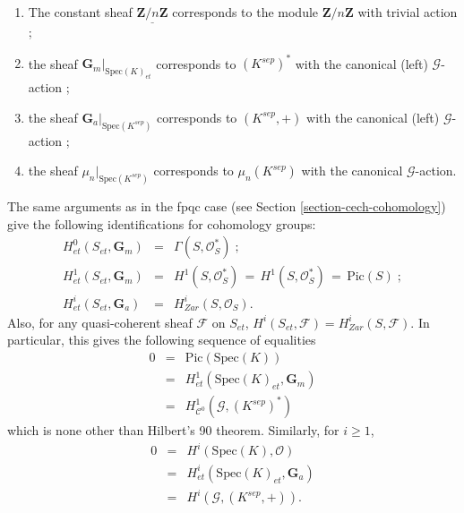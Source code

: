 \begin{example} $ $
\begin{enumerate}
\item The constant sheaf $\underline{\mathbf{Z}/n\mathbf{Z}}$ corresponds to 
the module $\mathbf{Z}/n\mathbf{Z}$ with trivial action ; 
\item the sheaf $\mathbf{G}_m|_{\text{Spec}(K)_{et}}$ corresponds to 
$(K^{sep})^*$ with the canonical (left) $\mathcal{G}$-action ;
\item the sheaf $\mathbf{G}_a|_{\text{Spec}(K^{sep})}$ corresponds to 
$(K^{sep}, +)$ with the canonical (left) $\mathcal{G}$-action ;
\item the sheaf $\mu_n|_{\text{Spec}(K^{sep})}$ corresponds to $\mu_n(K^{sep})$ 
with the canonical $\mathcal{G}$-action.
\end{enumerate}

\noindent
The same arguments as in the fpqc case (see
Section \ref{section-cech-cohomology})
give the following identifications for cohomology groups:
$$
\begin{matrix}
H_{et}^0(S_{et}, \mathbf{G}_m) & = & \Gamma(S, \mathcal{O}_S^*) \; ; \\
H_{et}^1(S_{et}, \mathbf{G}_m) & = & H^1(S, \mathcal{O}_S^*) \, = \,  H^1(S, 
\mathcal{O}_S^*) \, = \, \text{Pic}(S) \; ;\\
H_{et}^i(S_{et}, \mathbf{G}_a) & = & H_{Zar}^i(S, \mathcal{O}_S).
\end{matrix}
$$
Also, for any quasi-coherent sheaf $\mathcal{F}$ on $S_{et}$, $H^i(S_{et}, 
\mathcal{F}) = H_{Zar}^i(S, \mathcal{F})$.
In particular, this gives the following sequence of equalities
\begin{eqnarray*}
0 & = & \text{Pic}(\text{Spec}(K)) \\
& = & H_{et}^1(\text{Spec}(K)_{et}, \mathbf{G}_m) \\
& = & H^1_{\mathcal{C}^0}(\mathcal{G}, (K^{sep})^*) 
\end{eqnarray*}
which is none other than Hilbert's 90 theorem. Similarly, for $i \geq 1$,
\begin{eqnarray*}
0 & = & H^i(\text{Spec}(K), \mathcal{O}) \\
&  = & H_{et}^i(\text{Spec}(K)_{et}, \mathbf{G}_a) \\
& = & H^i(\mathcal{G}, (K^{sep}, +)).
\end{eqnarray*}
\end{example}


